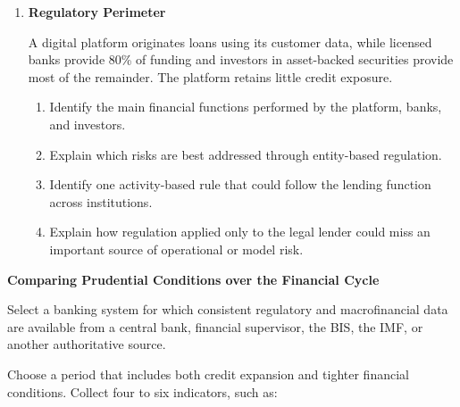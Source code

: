 \begin{enumerate}
\begin{enumerate}
\item Calculate the loss absorbed by equity, assuming equity absorbs losses first.
\item Calculate the loss allocated to eligible debt using Equation~\eqref{eq:ch23-bail-in-loss}.
\item Calculate the remaining eligible debt after the loss allocation.
\item Explain how the result would differ conceptually if the losses were covered by a public capital injection instead.
\end{enumerate}

\item \textbf{Regulatory Perimeter}

A digital platform originates loans using its customer data, while licensed banks provide 80\% of funding and investors in asset-backed securities provide most of the remainder. The platform retains little credit exposure.

\begin{enumerate}
\item Identify the main financial functions performed by the platform, banks, and investors.
\item Explain which risks are best addressed through entity-based regulation.
\item Identify one activity-based rule that could follow the lending function across institutions.
\item Explain how regulation applied only to the legal lender could miss an important source of operational or model risk.
\end{enumerate}

\end{enumerate}




\textbf{Comparing Prudential Conditions over the Financial Cycle}

Select a banking system for which consistent regulatory and macrofinancial data are available from a central bank, financial supervisor, the BIS, the IMF, or another authoritative source.

Choose a period that includes both credit expansion and tighter financial conditions. Collect four to six indicators, such as:

